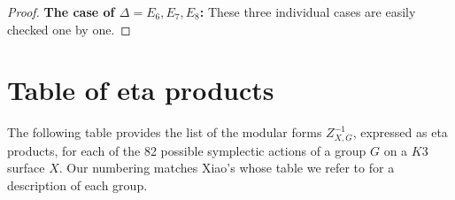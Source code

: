 \documentclass{article}
\theoremstyle{definition}
\begin{document}
\begin{proof}
\textbf{The case of $\Delta =E_{6},E_{7},E_{8}$:} These three
individual cases are easily checked one by one.

    
\end{proof}



\clearpage
\appendix
\section{Table of eta products}\label{app:tableeta}
\renewcommand{\arraystretch}{1.5}



The following table provides the list of the modular forms
$Z_{X,G}^{-1}$, expressed as eta products, for each of the 82 possible
symplectic actions of a group $G$ on a $K3$ surface $X$. Our numbering
matches Xiao's \cite{xiao1996galois} whose table we refer to for a
description of each group.
\end{document}
